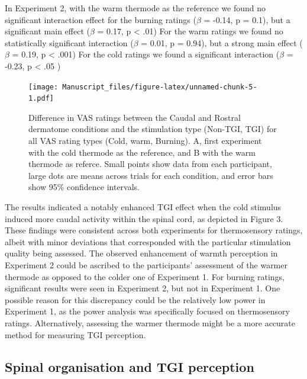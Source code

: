 \documentclass[
]{article}
\begin{document}
In Experiment 2, with the warm thermode as the reference we found no
significant interaction effect for the burning ratings (\(\beta\) =
-0.14, p = 0.1), but a significant main effect (\(\beta\) = 0.17, p
\textless{} .01) For the warm ratings we found no statistically
significant interaction (\(\beta\) = 0.01, p = 0.94), but a strong main
effect (\(\beta\) = 0.19, p \textless{} .001) For the cold ratings we
found a significant interaction (\(\beta\) = -0.23, p \textless{} .05 )

\begin{figure}
\centering
\texttt{[image: Manuscript\_files/figure-latex/unnamed-chunk-5-1.pdf]}
\caption{Difference in VAS ratings between the Caudal and Rostral
dermatome conditions and the stimulation type (Non-TGI, TGI) for all VAS
rating types (Cold, warm, Burning). A, first experiment with the cold
thermode as the reference, and B with the warm thermode as referce.
Small points show data from each participant, large dots are means
across trials for each condition, and error bars show 95\% confidence
intervals.}
\end{figure}

The results indicated a notably enhanced TGI effect when the cold
stimulus induced more caudal activity within the spinal cord, as
depicted in Figure 3. These findings were consistent across both
experiments for thermosensory ratings, albeit with minor deviations that
corresponded with the particular stimulation quality being assessed. The
observed enhancement of warmth perception in Experiment 2 could be
ascribed to the participants' assessment of the warmer thermode as
opposed to the colder one of Experiment 1. For burning ratings,
significant results were seen in Experiment 2, but not in Experiment 1.
One possible reason for this discrepancy could be the relatively low
power in Experiment 1, as the power analysis was specifically focused on
thermosensory ratings. Alternatively, assessing the warmer thermode
might be a more accurate method for measuring TGI perception.

\hypertarget{spinal-organisation-and-tgi-perception}{%
\subsection{Spinal organisation and TGI
perception}\label{spinal-organisation-and-tgi-perception}}
\end{document}
